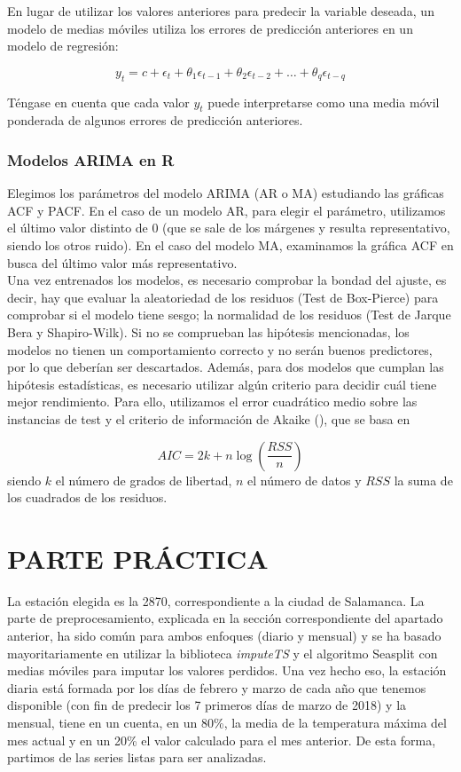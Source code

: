 En lugar de utilizar los valores anteriores para predecir la variable deseada, un modelo de medias móviles utiliza los errores de predicción anteriores en un modelo de regresión:

$$y_t = c + \epsilon_t + \theta_1 \epsilon_{t-1} + \theta_2 \epsilon_{t-2} + \dots + \theta_q \epsilon_{t-q}$$

Téngase en cuenta que cada valor $y_t$ puede interpretarse como una media móvil ponderada de algunos errores de predicción anteriores.

\subsubsection{Modelos ARIMA en R}

Elegimos los parámetros del modelo ARIMA (AR o MA) estudiando las gráficas ACF y PACF. En el caso de un modelo AR, para elegir el parámetro, utilizamos el último valor distinto de 0 (que se sale de los márgenes y resulta representativo, siendo los otros ruido). En el caso del modelo MA, examinamos la gráfica ACF en busca del último valor más representativo. \\

Una vez entrenados los modelos, es necesario comprobar la bondad del ajuste, es decir, hay que evaluar la aleatoriedad de los residuos (Test de Box-Pierce) para comprobar si el modelo tiene sesgo; la normalidad de los residuos (Test de Jarque Bera y Shapiro-Wilk). Si no se comprueban las hipótesis mencionadas, los modelos no tienen un comportamiento correcto y no serán buenos predictores, por lo que deberían ser descartados. Además, para dos modelos que cumplan las hipótesis estadísticas, es necesario utilizar algún criterio para decidir cuál tiene mejor rendimiento. Para ello, utilizamos el error cuadrático medio sobre las instancias de test y el criterio de información de Akaike (\cite{aic}), que se basa en

$$ AIC = 2k + n\log(\frac{RSS}{n})$$
siendo $k$ el número de grados de libertad, $n$ el número de datos y $RSS$ la suma de los cuadrados de los residuos. 

\section{PARTE PRÁCTICA}

La estación elegida es la 2870, correspondiente a la ciudad de Salamanca. La parte de preprocesamiento, explicada en la sección correspondiente del apartado anterior, ha sido común para ambos enfoques (diario y mensual) y se ha basado mayoritariamente en utilizar la biblioteca \textit{imputeTS} y el algoritmo Seasplit con medias móviles para imputar los valores perdidos. Una vez hecho eso, la estación diaria está formada por los días de febrero y marzo de cada año que tenemos disponible (con fin de predecir los 7 primeros días de marzo de 2018) y la mensual, tiene en un cuenta, en un 80\%, la media de la temperatura máxima del mes actual y en un 20\% el valor calculado para el mes anterior. De esta forma, partimos de las series listas para ser analizadas. 

